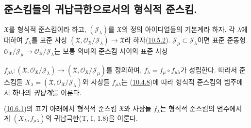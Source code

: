 \subsection{준스킴들의 귀납극한으로서의 형식적 준스킴.}
\label{subsection:I.10.6-ko}

\begin{env}[10.6.1]
\label{I.10.6.1-ko}
$\mathfrak{X}$를 형식적 준스킴이라 하고,
$(\mathscr{J}_\lambda)$를 $\mathfrak{X}$의 정의 아이디얼들의 기본계라
하자. 각 $\lambda$에 대하여 $f_\lambda$를 표준 사상
$(\mathfrak{X},\mathscr{O}_{\mathfrak{X}}/\mathscr{J}_\lambda)
\to\mathfrak{X}$라 하자(\hyperref[I.10.5.2-ko]{10.5.2}).
$\mathscr{J}_\mu\subset\mathscr{J}_\lambda$이면 표준 준동형
$\mathscr{O}_{\mathfrak{X}}/\mathscr{J}_\mu\to
\mathscr{O}_{\mathfrak{X}}/\mathscr{J}_\lambda$는 보통 의미의 준스킴
사이의 표준 사상


$f_{\mu\lambda}:(\mathfrak{X},
\mathscr{O}_{\mathfrak{X}}/\mathscr{J}_\lambda)\to
(\mathfrak{X},\mathscr{O}_{\mathfrak{X}}/\mathscr{J}_\mu)$를 정의하며,
$f_\lambda=f_\mu\circ f_{\mu\lambda}$가 성립한다. 따라서 준스킴들
$X_\lambda=(\mathfrak{X},
\mathscr{O}_{\mathfrak{X}}/\mathscr{J}_\lambda)$와 사상들
$f_{\mu\lambda}$는 (\hyperref[I.10.4.8-ko]{10.4.8})에 따라 형식적
준스킴의 범주에서 하나의 \emph{귀납계}를 이룬다.
\end{env}

\begin{proposition}[10.6.2]
\label{I.10.6.2-ko}
(\hyperref[I.10.6.1-ko]{10.6.1})의 표기 아래에서 형식적 준스킴
$\mathfrak{X}$와 사상들 $f_\lambda$는 형식적 준스킴의 범주에서 계
$(X_\lambda,f_{\mu\lambda})$의 귀납극한(T, I, 1.8)을 이룬다.
\end{proposition}

